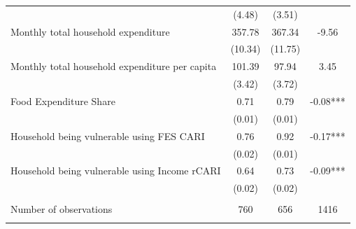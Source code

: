 \begin{tabular}{@{\extracolsep{5pt}}lccc}
 & (4.48)  & (3.51)  &  \\ [1ex]
Monthly total household expenditure   & 357.78    & 367.34    & -9.56   \\
 & (10.34)  & (11.75)  &  \\ [1ex]
Monthly total household expenditure per capita   & 101.39    & 97.94    & 3.45   \\
 & (3.42)  & (3.72)  &  \\ [1ex]
Food Expenditure Share   & 0.71    & 0.79    & -0.08***   \\
 & (0.01)  & (0.01)  &  \\ [1ex]
Household being vulnerable using FES CARI   & 0.76    & 0.92    & -0.17***   \\
 & (0.02)  & (0.01)  &  \\ [1ex]
Household being vulnerable using Income rCARI   & 0.64    & 0.73    & -0.09***   \\
 & (0.02)  & (0.02)  &  \\ [1ex]
\hline \\[-1.8ex]
Number of observations  & 760   & 656  & 1416  \\
\hline \hline \\[-1.8ex]

\end{tabular}

